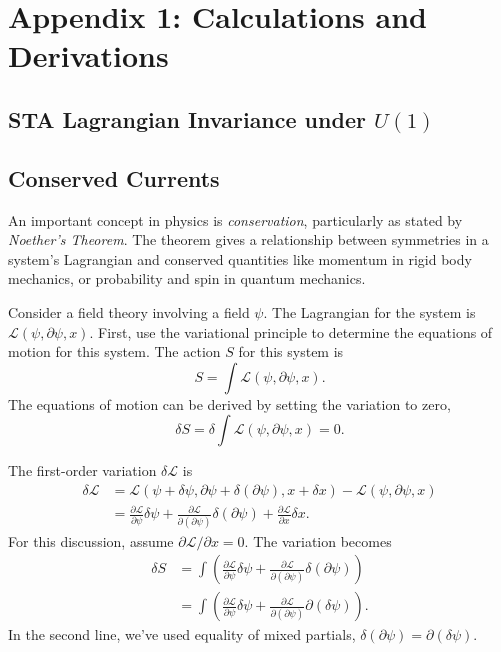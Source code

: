 \chapter{Appendix 1: Calculations and Derivations}

\section{STA Lagrangian Invariance under $U\left(1\right)$}

\section{Conserved Currents}

An important concept in physics is \emph{conservation}, particularly as stated by \emph{Noether's Theorem}. The theorem gives a relationship between symmetries in a system's Lagrangian and conserved quantities like momentum in rigid body mechanics, or probability and spin in quantum mechanics.

Consider a field theory involving a field $\psi$. The Lagrangian for the system is $\mathcal{L}\left(\psi,\partial\psi,x\right).$ First, use the variational principle to determine the equations of motion for this system. The action $S$ for this system is
\[
S = \int \mathcal{L}\left(\psi,\partial\psi,x\right).
\]
The equations of motion can be derived by setting the variation to zero,
\[
\delta S = \delta \int \mathcal{L}\left(\psi,\partial\psi,x\right) = 0.
\]

The first-order variation $\delta\mathcal{L}$ is
\begin{align*}
\delta\mathcal{L} &= \mathcal{L}\left(\psi + \delta\psi,\partial\psi + \delta \left(\partial\psi\right),x + \delta x\right) - \mathcal{L}\left(\psi,\partial\psi,x\right)\\
&= \frac{\partial\mathcal{L}}{\partial\psi}\delta\psi + \frac{\partial\mathcal{L}}{\partial\left(\partial\psi\right)}\delta \left(\partial\psi\right) + \frac{\partial\mathcal{L}}{\partial x}\delta x.
\end{align*}
For this discussion, assume $\partial\mathcal{L}/\partial x = 0$. The variation becomes
\begin{align*}
\delta S &= \int \left(\frac{\partial\mathcal{L}}{\partial\psi}\delta\psi + \frac{\partial\mathcal{L}}{\partial\left(\partial\psi\right)}\delta \left(\partial\psi\right)\right)\\
&=\int \left(\frac{\partial\mathcal{L}}{\partial\psi}\delta\psi + \frac{\partial\mathcal{L}}{\partial\left(\partial\psi\right)}\partial\left(\delta\psi\right)\right).
\end{align*}
In the second line, we've used equality of mixed partials, $\delta\left(\partial\psi\right) = \partial\left(\delta\psi\right).$

